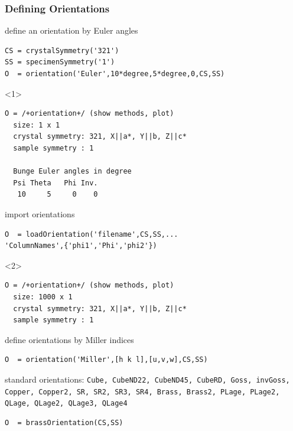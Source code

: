 \documentclass[compress]{beamer}
\begin{document}
\begin{frame}[fragile]
  \frametitle{Defining Orientations}

    \begin{overlayarea}{\textwidth}{8cm}
      define an orientation by Euler angles
  \begin{lstlisting}[style=input]
CS = crystalSymmetry('321')
SS = specimenSymmetry('1')
O  = orientation('Euler',10*degree,5*degree,0,CS,SS)
  \end{lstlisting}
  \begin{onlyenv}<1>
    \vspace{-.3cm}
  \begin{lstlisting}[style=output]
O = /+orientation+/ (show methods, plot)
  size: 1 x 1
  crystal symmetry: 321, X||a*, Y||b, Z||c*
  sample symmetry : 1

  Bunge Euler angles in degree
  Psi Theta   Phi Inv.
   10     5     0    0
  \end{lstlisting}
  \end{onlyenv}

  \pause
  import orientations
  \begin{lstlisting}[style=input]
O  = loadOrientation('filename',CS,SS,...
'ColumnNames',{'phi1','Phi','phi2'})
  \end{lstlisting}
  \begin{onlyenv}<2>
    \vspace{-.3cm}
  \begin{lstlisting}[style=output]
O = /+orientation+/ (show methods, plot)
  size: 1000 x 1
  crystal symmetry: 321, X||a*, Y||b, Z||c*
  sample symmetry : 1
  \end{lstlisting}
  \end{onlyenv}

\pause

define orientations by Miller indices
   \begin{lstlisting}[style=input]
O  = orientation('Miller',[h k l],[u,v,w],CS,SS)
  \end{lstlisting}

\pause

standard orientations: \texttt{Cube, CubeND22, CubeND45, CubeRD, Goss,
invGoss, Copper, Copper2, SR, SR2, SR3, SR4, Brass, Brass2, PLage, PLage2,
QLage, QLage2, QLage3, QLage4}

\begin{lstlisting}[style=input]
O  = brassOrientation(CS,SS)
\end{lstlisting}
\end{overlayarea}
\end{frame}
\end{document}

